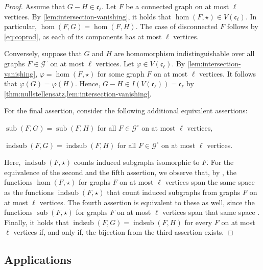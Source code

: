 \documentclass[11pt]{scrartcl}
\theoremstyle{definition}
\theoremstyle{plain}
\theoremstyle{remark}
\renewcommand\phi\varphi
\DeclareMathOperator{\indsub}{indsub}
\DeclareMathOperator{\sub}{sub}
\newcommand{\lG}{\mathcal{G}^\circ}
\begin{document}
	\lemCl*
	\begin{proof}
		Assume that $G - H \in \mathfrak{c}_\ell$.
		Let $F$ be a connected graph on at most $\ell$ vertices.
		By \cref{lem:intersection-vanishing}, it holds that $\hom(F, \star) \in V(\mathfrak{c}_\ell)$.
		In particular, $\hom(F, G) = \hom(F, H)$.
		The case of disconnected $F$ follows by \cref{eq:coprod}, as each of its components has at most $\ell$ vertices.

		Conversely, suppose that $G$ and $H$ are homomorphism indistinguishable over all graphs $F \in \lG$ on at most $\ell$ vertices.
		Let $\phi \in V(\mathfrak{c}_\ell)$.
		By \cref{lem:intersection-vanishing}, $\phi = \hom(F, \star)$ for some graph $F$ on at most $\ell$ vertices.
		It follows that $\phi(G) = \phi(H)$.
		Hence, $G -H \in I(V(\mathfrak{c}_\ell)) = \mathfrak{c}_\ell$ by  \cref{thm:nullstellensatz,lem:intersection-vanishing}.

        For the final assertion, consider the following additional equivalent assertions:
        \begin{assertions}[start=4]
            \item $\sub(F, G) = \sub(F, H)$ for all $F\in \lG$ on at most $\ell$ vertices,
			\item $\indsub(F, G) = \indsub(F, H)$ for all $F\in \lG$ on at most $\ell$ vertices.
        \end{assertions}    
        Here, $\indsub(F, \star)$ counts induced subgraphs isomorphic to $F$.
        For the equivalence of the second and the fifth assertion, 
		we observe that, by \cite{curticapean_homomorphisms_2017},
		the functions $\hom(F, \star)$ for graphs $F$ on at most $\ell$ vertices
		span the same space as the functions $\indsub(F, \star)$ that count induced subgraphs from graphs $F$ on at most $\ell$ vertices.
		The fourth assertion is equivalent to these as well,
		since the functions $\sub(F, \star)$ for graphs $F$ on at most $\ell$ vertices
		span that same space \cite{curticapean_homomorphisms_2017}.
		Finally, it holds that $\indsub(F, G) = \indsub(F, H)$ for every $F$ on at most $\ell$ vertices
		if, and only if, the bijection from the third assertion exists.
	\end{proof}




	\subsection{Applications}

	\label{sec:applications}
\end{document}
